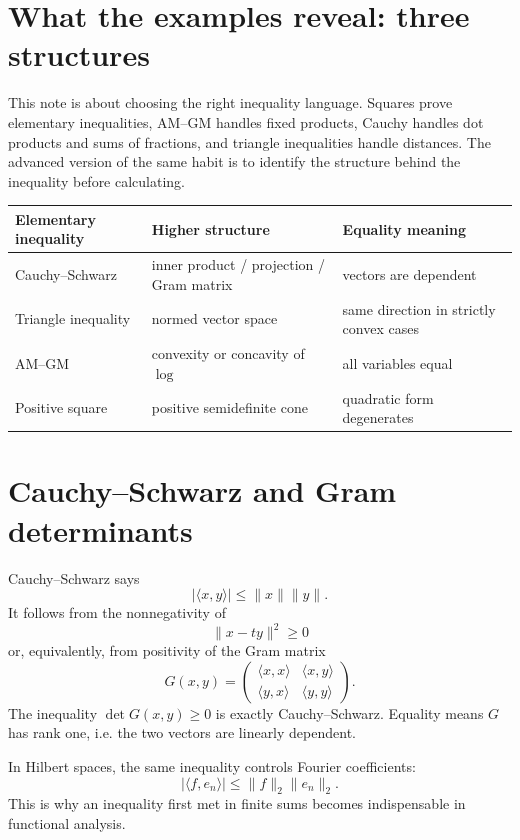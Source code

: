 \section{What the examples reveal: three structures}

This note is about choosing the right inequality language.  Squares prove elementary inequalities, AM--GM handles fixed products, Cauchy handles dot products and sums of fractions, and triangle inequalities handle distances.  The advanced version of the same habit is to identify the structure behind the inequality before calculating.

\begin{center}
\small
\begin{tabularx}{\textwidth}{@{}lYY@{}}
\toprule
Elementary inequality & Higher structure & Equality meaning\\
\midrule
Cauchy--Schwarz & inner product / projection / Gram matrix & vectors are dependent\\
Triangle inequality & normed vector space & same direction in strictly convex cases\\
AM--GM & convexity or concavity of \(\log\) & all variables equal\\
Positive square & positive semidefinite cone & quadratic form degenerates\\
\bottomrule
\end{tabularx}
\end{center}

\section{Cauchy--Schwarz and Gram determinants}

Cauchy--Schwarz says
\[
  |\langle x,y\rangle|\le \|x\|\|y\|.
\]
It follows from the nonnegativity of
\[
  \|x-ty\|^2\ge0
\]
or, equivalently, from positivity of the Gram matrix
\[
  G(x,y)=
  \begin{pmatrix}
  \langle x,x\rangle&\langle x,y\rangle\\
  \langle y,x\rangle&\langle y,y\rangle
  \end{pmatrix}.
\]
The inequality \(\det G(x,y)\ge0\) is exactly Cauchy--Schwarz.  Equality means \(G\) has rank one, i.e. the two vectors are linearly dependent.

In Hilbert spaces, the same inequality controls Fourier coefficients:
\[
  |\langle f,e_n\rangle|\le \|f\|_2\|e_n\|_2.
\]
This is why an inequality first met in finite sums becomes indispensable in functional analysis.

